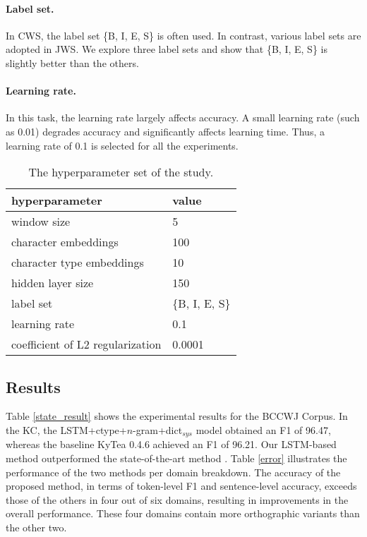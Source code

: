 \documentclass[11pt]{article}
\begin{document}
\paragraph{Label set.}  In CWS, the label set \{B, I, E, S\} is often used. In
contrast, various label sets are adopted in JWS. We explore three label sets
and show that \{B, I, E, S\} is slightly better than the others.

\paragraph{Learning rate.} In this task, the learning rate largely affects
accuracy. A small learning rate (such as 0.01) degrades accuracy and
significantly affects learning time. Thus, a learning rate of 0.1 is
selected for all the experiments.

\begin{table}[t]
\caption{The hyperparameter set of the study.}
\label{parameter}
\centering
 \begin{tabular}{ll}
    \toprule
    hyperparameter            & value \\
    \midrule
    window size                & 5  \\
    character embeddings       & 100\\
    character type embeddings  & 10 \\
    hidden layer size          & 150\\
    label set                  & \{B, I, E, S\} \\
    learning rate              & 0.1\\
    coefficient of L2 regularization & 0.0001\\
   \bottomrule
\end{tabular}
\end{table}
 
                  
\subsection{Results}
Table \ref{state_result} shows the experimental results for the BCCWJ Corpus.
In the KC, the LSTM+ctype+$n$-gram+dict$_{\mathit{sys}}$ model obtained
an F1 of 96.47, whereas the baseline KyTea 0.4.6 achieved an F1 of 96.21.
Our LSTM-based method outperformed the state-of-the-art method
\cite{neubig-nakata-mori:2011:ACL-HLT2011}. Table \ref{error} illustrates the
performance of the two methods per domain breakdown. The accuracy of the
proposed method, in terms of token-level F1 and sentence-level accuracy,
exceeds those of the others in four out of six domains, resulting in
improvements in the overall performance.  These four domains contain more
orthographic variants than the other two.
\end{document}
